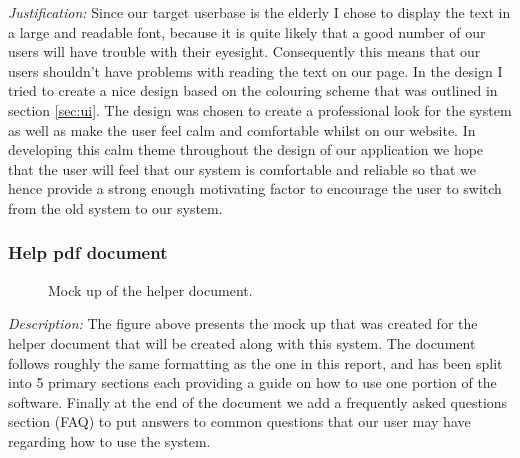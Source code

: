 \textit{Justification:}
Since our target userbase is the elderly I chose to display 
the text in a large and readable font, because it is quite 
likely that a good number of our users will have trouble 
with their eyesight. Consequently this means that our 
users shouldn't have problems with reading the text on our 
page. In the design I tried to create a nice design based on 
the colouring scheme that was outlined in section \ref{sec:ui}.
The design was chosen to create a professional look for the 
system as well as make the user feel calm and comfortable 
whilst on our website. In developing this calm theme 
throughout the design of our application we hope that 
the user will feel that our system is comfortable and 
reliable so that we hence provide a strong enough
motivating factor to encourage the user to switch from
the old system to our system.

\subsubsection{Help pdf document}

\begin{figure}[H]
\centering


\caption{Mock up of the helper document.}
\label{fig:help}
\end{figure}

\textit{Description:} The figure above presents the mock up 
that was created for the helper document that will be 
created along with this system. The document follows roughly
the same formatting as the one in this report, and has been 
split into 5 primary sections each providing a guide on how 
to use one portion of the software. Finally at the end of
the document we add a frequently asked questions section 
(FAQ) to put answers to common questions that our user may 
have regarding how to use the system.
\\ \vspace{0.2cm}

